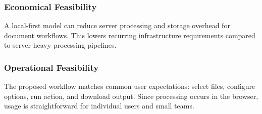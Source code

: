 \subsubsection{Economical Feasibility}
A local-first model can reduce server processing and storage overhead for document workflows. This lowers recurring infrastructure requirements compared to server-heavy processing pipelines.

\subsubsection{Operational Feasibility}
The proposed workflow matches common user expectations: select files, configure options, run action, and download output. Since processing occurs in the browser, usage is straightforward for individual users and small teams.
